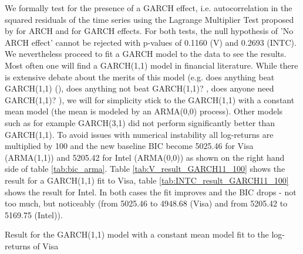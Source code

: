 We formally test for the presence of a GARCH effect, i.e. autocorrelation in the squared residuals of the time series using the Lagrange Multiplier Test proposed by \citet{engle_autoregressive_1982} for ARCH and \citet{lee_lagrange_1991} for GARCH effects. For both tests, the null hypothesis of 'No ARCH effect' cannot be rejected with p-values of 0.1160 (V) and 0.2693 (INTC). We nevertheless proceed to fit a GARCH model to the data to see the results. Most often one will find a GARCH(1,1) model in financial literature. While there is extensive debate about the merits of this model (e.g. does anything beat GARCH(1,1) (\cite{hansen_forecast_2005}), does anything not beat GARCH(1,1)? \citep{alexios_does_2013}, does anyone need GARCH(1,1)? \citep{reschenhofer_does_2013}), we will for simplicity stick to the GARCH(1,1) with a constant mean model (the mean is modeled by an ARMA(0,0) process). Other models such as for example GARCH(3,1) did not perform significantly better than GARCH(1,1). To avoid issues with numerical instability all log-returns are multiplied by 100 and the new baseline BIC become 5025.46 for Visa (ARMA(1,1)) and 5205.42 for Intel (ARMA(0,0)) as shown on the right hand side of table \ref{tab:bic_arma}. Table \ref{tab:V_result_GARCH11_100} shows the result for a GARCH(1,1) fit to Visa, table \ref{tab:INTC_result_GARCH11_100} shows the result for Intel. In both cases the fit improves and the BIC drops - not too much, but noticeably (from 5025.46 to 4948.68 (Visa) and from 5205.42 to 5169.75 (Intel)). 

\begin{table}[h!]
    \centering
    \vspace{-2ex}
    \small
    
    \caption{Result for the GARCH(1,1) model with a constant mean model fit to the log-returns of Visa}
    \label{tab:V_result_GARCH11_100}
\end{table}{}

